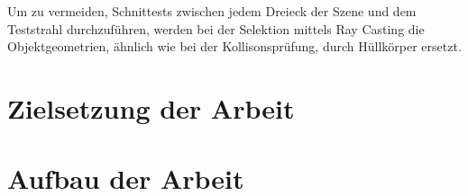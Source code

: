 Um zu vermeiden, Schnittests zwischen jedem Dreieck der Szene
und dem Teststrahl durchzuführen, werden bei der Selektion mittels Ray Casting die Objektgeometrien, \"ahnlich wie bei der Kollisonspr\"ufung, durch H\"ullk\"orper ersetzt.

\section{Zielsetzung der Arbeit}
\label{problem}

\section{Aufbau der Arbeit}

